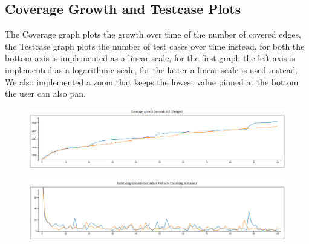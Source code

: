 \documentclass[conference,compsoc]{IEEEtran}
\begin{document}
\subsection{Coverage Growth and Testcase Plots}
The Coverage graph plots the growth over time of the number of covered edges, the Testcase graph plots the number of test cases over time instead, for both the bottom axis is implemented as a linear scale, for the first graph the left axis is implemented as a logarithmic scale, for the latter a linear scale is used instead.
We also implemented a zoom that keeps the lowest value pinned at the bottom the user can also pan.
\begin{figure}[H]
  \includegraphics[scale=0.2]{img/coverage}
  \label{fig:coverage}
\end{figure}
\begin{figure}[H]
  \includegraphics[scale=0.2]{img/inputs}
  \label{fig:inputs}
\end{figure}
\end{document}
